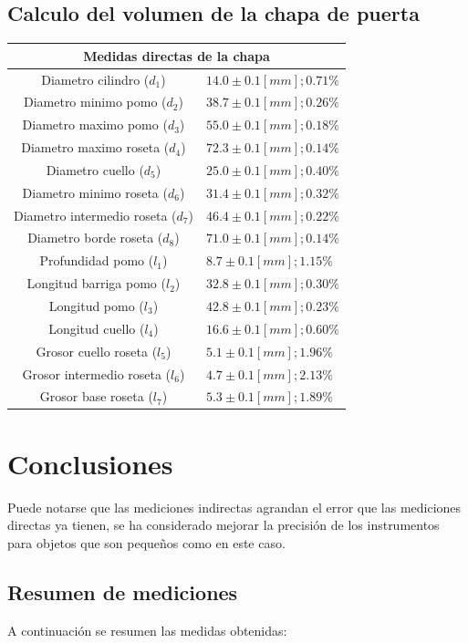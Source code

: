 \documentclass[letter,11pt]{article}
\begin{document}
\subsection{Calculo del volumen de la chapa de puerta}
\begin{center}
\begin{tabular}{|c|>{\centering}m{5.0cm}<{\centering}|}
\hline
\multicolumn{2}{|c|}{\textbf{Medidas directas de la chapa}}
\tabularnewline \hline
         Diametro cilindro ($d_1$) & $14.0 \pm 0.1 [mm]; 0.71\%$
\tabularnewline \hline
      Diametro minimo pomo ($d_2$) & $38.7 \pm 0.1 [mm]; 0.26\%$
\tabularnewline \hline
      Diametro maximo pomo ($d_3$) & $55.0 \pm 0.1 [mm]; 0.18\%$
\tabularnewline \hline
    Diametro maximo roseta ($d_4$) & $72.3 \pm 0.1 [mm]; 0.14\%$
\tabularnewline \hline
           Diametro cuello ($d_5$) & $25.0 \pm 0.1 [mm]; 0.40\%$
\tabularnewline \hline
    Diametro minimo roseta ($d_6$) & $31.4 \pm 0.1 [mm]; 0.32\%$
\tabularnewline \hline
Diametro intermedio roseta ($d_7$) & $46.4 \pm 0.1 [mm]; 0.22\%$
\tabularnewline \hline
     Diametro borde roseta ($d_8$) & $71.0 \pm 0.1 [mm]; 0.14\%$
\tabularnewline \hline
          Profundidad pomo ($l_1$) & $ 8.7 \pm 0.1 [mm]; 1.15\%$
\tabularnewline \hline
     Longitud barriga pomo ($l_2$) & $32.8 \pm 0.1 [mm]; 0.30\%$
\tabularnewline \hline
             Longitud pomo ($l_3$) & $42.8 \pm 0.1 [mm]; 0.23\%$
\tabularnewline \hline
           Longitud cuello ($l_4$) & $16.6 \pm 0.1 [mm]; 0.60\%$
\tabularnewline \hline
      Grosor cuello roseta ($l_5$) & $ 5.1 \pm 0.1 [mm]; 1.96\%$
\tabularnewline \hline
  Grosor intermedio roseta ($l_6$) & $ 4.7 \pm 0.1 [mm]; 2.13\%$
\tabularnewline \hline
        Grosor base roseta ($l_7$) & $ 5.3 \pm 0.1 [mm]; 1.89\%$
\tabularnewline \hline
\end{tabular}
\end{center}

\section{Conclusiones}
Puede notarse que las mediciones indirectas agrandan el error que las mediciones
directas ya tienen, se ha considerado mejorar la precisión de los instrumentos
para objetos que son pequeños como en este caso.

\subsection{Resumen de mediciones}
A continuación se resumen las medidas obtenidas:
\end{document}
